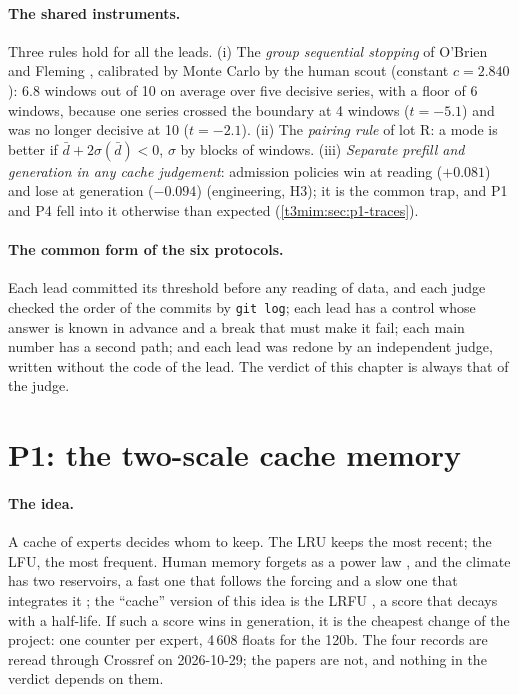 \paragraph{The shared instruments.} Three rules hold for all the leads. (i) The \emph{group sequential stopping} of O'Brien and Fleming \cite{obrien1979}, calibrated by Monte Carlo by the human scout (constant $c = 2.840$): 6.8 windows out of 10 on average over five decisive series, with a floor of 6 windows, because one series crossed the boundary at 4 windows ($t = -5.1$) and was no longer decisive at 10 ($t = -2.1$). (ii) The \emph{pairing rule} of lot R: a mode is better if $\bar d + 2\sigma(\bar d) < 0$, $\sigma$ by blocks of windows. (iii) \emph{Separate prefill and generation in any cache judgement}: admission policies win at reading ($+0.081$) and lose at generation ($-0.094$) (engineering, H3); it is the common trap, and P1 and P4 fell into it otherwise than expected (\cref{t3mim:sec:p1-traces}).

\paragraph{The common form of the six protocols.} Each lead committed its threshold before any reading of data, and each judge checked the order of the commits by \texttt{git log}; each lead has a control whose answer is known in advance and a break that must make it fail; each main number has a second path; and each lead was redone by an independent judge, written without the code of the lead. The verdict of this chapter is always that of the judge.

\section{P1: the two-scale cache memory}\label{t3mim:sec:p1}

\paragraph{The idea.} A cache of experts decides whom to keep. The LRU keeps the most recent; the LFU, the most frequent. Human memory forgets as a power law \cite{anderson1991reflections}, and the climate has two reservoirs, a fast one that follows the forcing and a slow one that integrates it \cite{hasselmann1976stochastic}; the ``cache'' version of this idea is the LRFU \cite{lee2001lrfu}, a score that decays with a half-life. If such a score wins in generation, it is the cheapest change of the project: one counter per expert, 4\,608 floats for the 120b. The four records are reread through Crossref on 2026-10-29; the papers are not, and nothing in the verdict depends on them.

